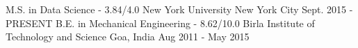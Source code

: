 \begin{cventries}
  \cventry
    {M.S. in Data Science - 3.84/4.0}
    {New York University}
    {New York City}
    {Sept. 2015 - PRESENT}
    {
    }
  \cventry
    {B.E. in Mechanical Engineering - 8.62/10.0}
    {Birla Institute of Technology and Science}
    {Goa, India}
    {Aug 2011 - May 2015}
    {
    }
\end{cventries}
